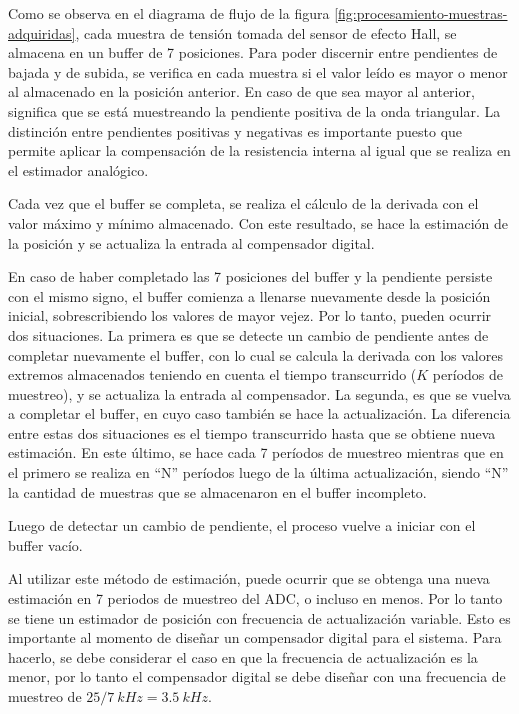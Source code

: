 \noindent Como se observa en el diagrama de flujo de la figura \ref{fig:procesamiento-muestras-adquiridas}, cada muestra de tensión tomada del sensor de efecto Hall, se almacena en un buffer de 7 posiciones. Para poder discernir entre pendientes de bajada y de subida, se verifica en cada muestra si el valor leído es mayor o menor al almacenado en la posición anterior. En caso de que sea mayor al anterior, significa que se está muestreando la pendiente positiva de la onda triangular. La distinción entre pendientes positivas y negativas es importante puesto que permite aplicar la compensación de la resistencia interna al igual que se realiza en el estimador analógico. 

\noindent Cada vez que el buffer se completa, se realiza el cálculo de la derivada con el valor máximo y mínimo almacenado. Con este resultado, se hace la estimación de la posición y se actualiza la entrada al compensador digital.

\noindent En caso de haber completado las 7 posiciones del buffer y la pendiente persiste con el mismo signo, el buffer comienza a llenarse nuevamente desde la posición inicial, sobrescribiendo los valores de mayor vejez. Por lo tanto, pueden ocurrir dos situaciones. La primera es que se detecte un cambio de pendiente antes de completar nuevamente el buffer, con lo cual se calcula la derivada con los valores extremos almacenados teniendo en cuenta el tiempo transcurrido ($K$ períodos de muestreo), y se actualiza la entrada al compensador. La segunda, es que se vuelva a completar el buffer, en cuyo caso también se hace la actualización. La diferencia entre estas dos situaciones es el tiempo transcurrido hasta que se obtiene nueva estimación. En este último, se hace cada 7 períodos de muestreo mientras que en el primero se realiza en “N” períodos luego de la última actualización, siendo “N” la cantidad de muestras que se almacenaron en el buffer incompleto.

\noindent Luego de detectar un cambio de pendiente, el
proceso vuelve a iniciar con el buffer vacío.

\noindent Al utilizar este método de estimación, puede ocurrir que se obtenga una nueva estimación en 7 periodos de muestreo del ADC, o incluso en menos. Por lo tanto se tiene un estimador de posición con frecuencia de actualización variable. Esto es importante al momento de diseñar un compensador digital para el sistema. Para hacerlo, se debe considerar el caso en que la frecuencia de actualización es la menor, por lo tanto el compensador digital se debe diseñar con una frecuencia de muestreo de $25/7 \:kHz = 3.5\:kHz$.

